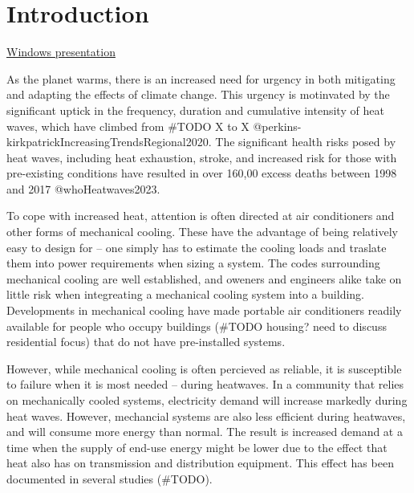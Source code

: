 \documentclass[
  letterpaper,
  DIV=11,
  numbers=noendperiod]{scrartcl}
\author{}
\date{}
\begin{document}
\ifdefined\Shaded\renewenvironment{Shaded}{\begin{tcolorbox}[boxrule=0pt, frame hidden, borderline west={3pt}{0pt}{shadecolor}, enhanced, interior hidden, breakable, sharp corners]}{\end{tcolorbox}}\fi

\hypertarget{introduction}{%
\section{Introduction}\label{introduction}}

\href{file:///Users/julietnwagwuume-ezeoke/_UILCode/windows/summary/230530_pres/UILpres.html\#/mechanical-cooling}{Windows
presentation}

As the planet warms, there is an increased need for urgency in both
mitigating and adapting the effects of climate change. This urgency is
motinvated by the significant uptick in the frequency, duration and
cumulative intensity of heat waves, which have climbed from \#TODO X to
X @perkins-kirkpatrickIncreasingTrendsRegional2020. The significant
health risks posed by heat waves, including heat exhaustion, stroke, and
increased risk for those with pre-existing conditions have resulted in
over 160,00 excess deaths between 1998 and 2017 @whoHeatwaves2023.

To cope with increased heat, attention is often directed at air
conditioners and other forms of mechanical cooling. These have the
advantage of being relatively easy to design for -- one simply has to
estimate the cooling loads and traslate them into power requirements
when sizing a system. The codes surrounding mechanical cooling are well
established, and oweners and engineers alike take on little risk when
integreating a mechanical cooling system into a building. Developments
in mechanical cooling have made portable air conditioners readily
available for people who occupy buildings (\#TODO housing? need to
discuss residential focus) that do not have pre-installed systems.

However, while mechanical cooling is often percieved as reliable, it is
susceptible to failure when it is most needed -- during heatwaves. In a
community that relies on mechanically cooled systems, electricity demand
will increase markedly during heat waves. However, mechancial systems
are also less efficient during heatwaves, and will consume more energy
than normal. The result is increased demand at a time when the supply of
end-use energy might be lower due to the effect that heat also has on
transmission and distribution equipment. This effect has been documented
in several studies (\#TODO).
\end{document}
